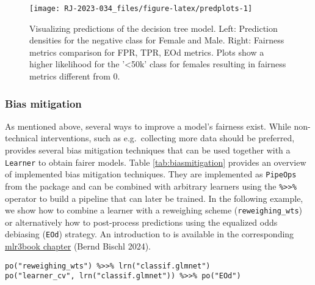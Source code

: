 \begin{figure}

{\centering \texttt{[image: RJ-2023-034\_files/figure-latex/predplots-1]} 

}

\caption{Visualizing predictions of the decision tree model. Left: Prediction densities for the negative class for Female and Male. Right: Fairness metrics comparison for FPR, TPR, EOd metrics. Plots show a higher likelihood for the '<50k' class for females resulting in fairness metrics different from 0.}\label{fig:predplots}
\end{figure}

\hypertarget{bias-mitigation-1}{%
\subsubsection{Bias mitigation}\label{bias-mitigation-1}}

As mentioned above, several ways to improve a model's fairness exist.
While non-technical interventions, such as e.g.~collecting more data should be preferred,
 provides several bias mitigation techniques that can be used together with a \texttt{Learner} to obtain fairer models.
Table \ref{tab:biasmitigation} provides an overview of implemented bias mitigation techniques.
They are implemented as \texttt{PipeOps} from the  package and can be
combined with arbitrary learners using the \texttt{\%\textgreater{}\textgreater{}\%} operator to build a pipeline that can later be trained.
In the following example, we show how to combine a learner with a reweighing scheme (\texttt{reweighing\_wts}) or alternatively how to post-process predictions using the equalized odds debiasing (\texttt{EOd}) strategy.
An introduction to  is available in the corresponding \href{https://mlr3book.mlr-org.com/pipelines.html}{mlr3book chapter} (Bernd Bischl 2024).

\begin{verbatim}
po("reweighing_wts") %>>% lrn("classif.glmnet")
po("learner_cv", lrn("classif.glmnet")) %>>% po("EOd")
\end{verbatim}

